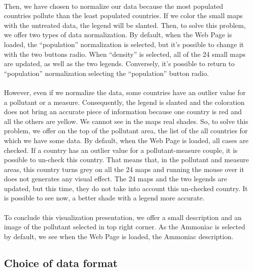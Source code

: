 \documentclass[preprint,journal]{vgtc}       %
\begin{document}
\paragraph{}
Then, we have chosen to normalize our data because the most populated countries pollute than the least populated countries. If we color the small maps with the untreated data, the legend will be slanted. Then, to solve this problem, we offer two types of data normalization. By default, when the Web Page is loaded, the “population” normalization is selected, but it’s possible to change it with the two buttons radio. When “density” is selected, all of the 24 small maps are updated, as well as the two legends. Conversely, it’s possible to return to “population” normalization selecting the “population” button radio. 
\paragraph{}
However, even if we normalize the data, some countries have an outlier value for a pollutant or a measure. Consequently, the legend is slanted and the coloration does not bring an accurate piece of information because one country is red and all the others are yellow. We cannot see in the maps real shades. 
\newline
So, to solve this problem, we offer on the top of the pollutant area, the list of the all countries for which we have some data. By default, when the Web Page is loaded, all cases are checked. If a country has an outlier value for a pollutant-measure couple, it is possible to un-check this country. That means that, in the pollutant and measure areas, this country turns grey on all the 24 maps and running the mouse over it does not generates any visual effect.  The 24 maps and the two legends are updated, but this time, they do not take into account this un-checked country. It is possible to see now, a better shade with a legend more accurate.
\paragraph{}
To conclude this visualization presentation, we offer a small description and an image of the pollutant selected in top right corner. As the Ammoniac is selected by default, we see when the Web Page is loaded, the Ammoniac description.
	
	\subsection{Choice of data format}
\end{document}
